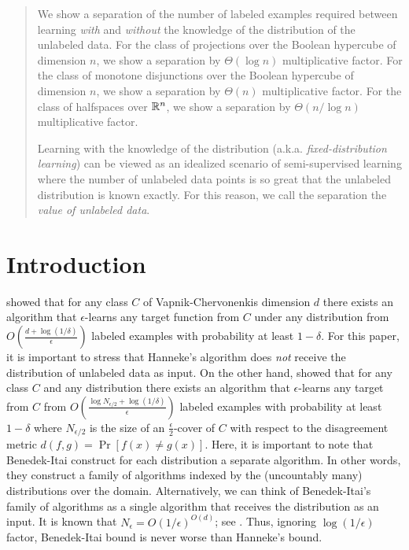 \begin{abstract}
We show a separation of the number of labeled examples required between learning
\emph{with} and \emph{without} the knowledge of the distribution of the
unlabeled data. For the class of projections over the Boolean hypercube of
dimension $n$, we show a separation by $\Theta(\log n)$ multiplicative factor.
For the class of monotone disjunctions over the Boolean hypercube of dimension
$n$, we show a separation by $\Theta(n)$ multiplicative factor. For the class of
halfspaces over $\mathbb{R}^n$, we show a separation by  $\Theta(n/\log n)$
multiplicative factor.

Learning with the knowledge of the distribution (a.k.a. \emph{fixed-distribution
learning}) can be viewed as an idealized scenario of semi-supervised learning
where the number of unlabeled data points is so great that the unlabeled
distribution is known exactly. For this reason, we call the separation the
\emph{value of unlabeled data}.
\end{abstract}


\section{Introduction}

\cite{Hanneke-2016} showed that for any class $C$ of Vapnik-Chervonenkis
dimension $d$ there exists an algorithm that $\epsilon$-learns any target
function from $C$ under any distribution from $O\left(\frac{d +
\log(1/\delta)}{\epsilon}\right)$ labeled examples with probability at least
$1-\delta$. For this paper, it is important to stress that Hanneke's algorithm
does \emph{not} receive the distribution of unlabeled data as input. On the
other hand, \cite{Benedek-Itai-1991} showed that for any class $C$ and any
distribution there exists an algorithm that $\epsilon$-learns any target from
$C$ from $O \left( \frac{\log N_{\epsilon/2} + \log (1/\delta)}{\epsilon}\right)$
labeled examples with probability at least $1-\delta$ where $N_{\epsilon/2}$ is the
size of an $\frac{\epsilon}{2}$-cover of $C$ with respect to the disagreement metric
$d(f,g) = \Pr[f(x) \neq g(x)]$. Here, it is important to note that Benedek-Itai
construct for each distribution a separate algorithm. In other words, they
construct a family of algorithms indexed by the (uncountably many) distributions
over the domain. Alternatively, we can think of Benedek-Itai's family of
algorithms as a single algorithm that receives the distribution as an input. It
is known that $N_\epsilon = O(1/\epsilon)^{O(d)}$; see \cite{Dudley-1978}. Thus,
ignoring $\log(1/\epsilon)$ factor, Benedek-Itai bound is never worse than
Hanneke's bound.

